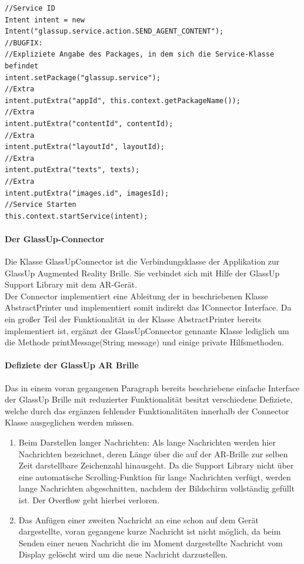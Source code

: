 \begin{lstlisting}
//Service ID
Intent intent = new Intent("glassup.service.action.SEND_AGENT_CONTENT");
//BUGFIX:
//Expliziete Angabe des Packages, in dem sich die Service-Klasse befindet
intent.setPackage("glassup.service");
//Extra
intent.putExtra("appId", this.context.getPackageName());
//Extra
intent.putExtra("contentId", contentId);
//Extra
intent.putExtra("layoutId", layoutId);
//Extra
intent.putExtra("texts", texts);
//Extra
intent.putExtra("images.id", imagesId);
//Service Starten
this.context.startService(intent); 
\end{lstlisting}

\paragraph{Der GlassUp-Connector}
Die Klasse GlassUpConnector ist die Verbindungsklasse der Applikation zur GlassUp Augmented Reality Brille. Sie verbindet sich mit Hilfe der GlassUp Support Library mit dem AR-Gerät.\\
Der Connector implementiert eine Ableitung der in  beschriebenen Klasse AbstractPrinter und implementiert somit indirekt das IConnector Interface. Da ein großer Teil der Funktionalität in der Klasse AbstractPrinter bereits implementiert ist, ergänzt der GlassUpConnector gennante Klasse lediglich um die Methode printMessage(String message) und einige private Hilfsmethoden.\\

\paragraph{Defiziete der GlassUp AR Brille}
Das in einem voran gegangenen Paragraph bereits beschriebene einfache Interface der GlassUp Brille mit reduzierter Funktionalität besitzt verschiedene Defiziete, welche durch das ergänzen fehlender Funktionalitäten innerhalb der Connector Klasse ausgeglichen werden müssen.
\begin{enumerate} 
	\item Beim Darstellen langer Nachrichten: Als lange Nachrichten werden hier Nachrichten bezeichnet, deren Länge über die auf der AR-Brille zur selben Zeit darstellbare Zeichenzahl hinausgeht. Da die Support Library nicht über eine automatische Scrolling-Funktion für lange Nachrichten verfügt, werden lange Nachrichten abgeschnitten, nachdem der Bildschirm vollständig gefüllt ist. Der Overflow geht hierbei verloren.
	\item Das Anfügen einer zweiten Nachricht an eine schon auf dem Gerät dargestellte, voran gegangene kurze Nachricht ist nicht möglich, da beim Senden einer neuen Nachricht die im Moment dargestellte Nachricht vom Display gelöscht wird um die neue Nachricht darzustellen.
\end{enumerate}

